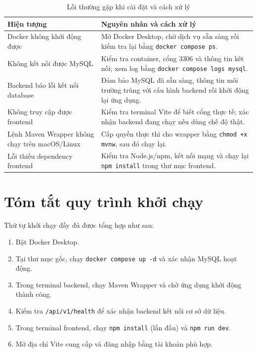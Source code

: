 \begin{table}[htbp]
\centering
\caption{Lỗi thường gặp khi cài đặt và cách xử lý}
\label{tab:installation-troubleshooting}
\begin{tabular}{|p{4cm}|p{9cm}|}
\hline
\textbf{Hiện tượng} & \textbf{Nguyên nhân và cách xử lý} \\ \hline
Docker không khởi động được & Mở Docker Desktop, chờ dịch vụ sẵn sàng rồi kiểm tra lại bằng \texttt{docker compose ps}. \\ \hline
Không kết nối được MySQL & Kiểm tra container, cổng 3306 và thông tin kết nối; xem log bằng \texttt{docker compose logs mysql}. \\ \hline
Backend báo lỗi kết nối database & Đảm bảo MySQL đã sẵn sàng, thông tin môi trường trùng với cấu hình backend rồi khởi động lại ứng dụng. \\ \hline
Không truy cập được frontend & Kiểm tra terminal Vite để biết cổng thực tế; xác nhận backend đang chạy nếu dùng chế độ thật. \\ \hline
Lệnh Maven Wrapper không chạy trên macOS/Linux & Cấp quyền thực thi cho wrapper bằng \texttt{chmod +x mvnw}, sau đó chạy lại. \\ \hline
Lỗi thiếu dependency frontend & Kiểm tra Node.js/npm, kết nối mạng và chạy lại \texttt{npm install} trong thư mục frontend. \\ \hline
\end{tabular}
\end{table}

\section{Tóm tắt quy trình khởi chạy}

Thứ tự khởi chạy đầy đủ được tổng hợp như sau:
\begin{enumerate}[label=\arabic*)]
    \item Bật Docker Desktop.
    \item Tại thư mục gốc, chạy \texttt{docker compose up -d} và xác nhận MySQL hoạt động.
    \item Trong terminal backend, chạy Maven Wrapper và chờ ứng dụng khởi động thành công.
    \item Kiểm tra \texttt{/api/v1/health} để xác nhận backend kết nối cơ sở dữ liệu.
    \item Trong terminal frontend, chạy \texttt{npm install} (lần đầu) và \texttt{npm run dev}.
    \item Mở địa chỉ Vite cung cấp và đăng nhập bằng tài khoản phù hợp.
\end{enumerate}
